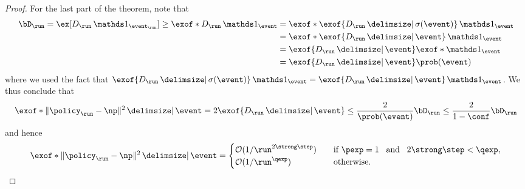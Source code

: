 \begin{proof}
For the last part of the theorem, note that
\begin{align}
\curr[\bD]
	= \ex[D_{\run} \one_{\event_{\run}}]
	\geq \exof*{D_{\run} \one_{\event}}
	&= \exof*{\exof{D_{\run} \given \sigma(\event)} \one_{\event}}
	\notag\\
	&= \exof*{\exof{D_{\run} \given \event} \one_{\event}} 
	\notag\\
	&= \exof{D_{\run} \given \event} \exof*{\one_{\event}} 
	\notag\\
	&= \exof{D_{\run} \given \event} \prob\parens{\event} 
\end{align}
where we used the fact that $\exof{D_{\run} \given \sigma(\event)} \one_{\event} = \exof{D_{\run} \given \event} \one_{\event}$.
We thus conclude that
\begin{align}
\exof*{\norm{\policy_{\run} - \np}^{2} \given \event}
	= 2\exof{D_{\run} \given \event} \leq \frac{2}{\prob(\event)}\curr[\bD]
	\leq \frac{2}{1-\conf}\curr[\bD]
	\notag\\
\end{align}
and hence
\begin{equation*}
\begin{aligned}
\exof*{\norm{\policy_{\run} - \np}^{2} \given \event} =
	\begin{cases}
	\bigoh(1/\run^{2\strong\step})
		&\quad
		\text{if $\pexp=1$ \, and \, $2\strong\step<\qexp$},
		\\
	\bigoh(1/\run^{\qexp})
		&\quad
		\text{otherwise}.
	\end{cases}
\end{aligned}
\qedhere
\end{equation*}
\end{proof}

